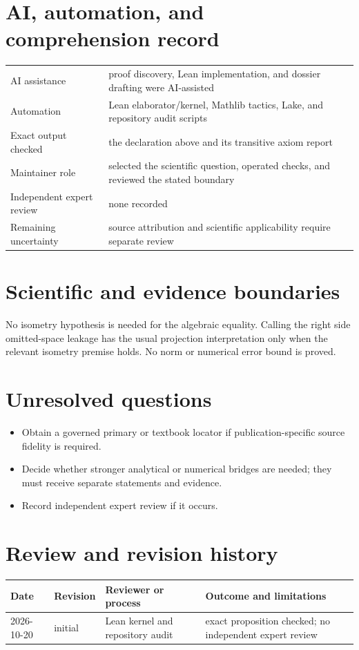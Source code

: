 \documentclass[11pt]{article}
\begin{document}
\section{AI, automation, and comprehension record}
\begin{tabularx}{\textwidth}{@{}lY@{}}\toprule
AI assistance & proof discovery, Lean implementation, and dossier drafting were AI-assisted \\
Automation & Lean elaborator/kernel, Mathlib tactics, Lake, and repository audit scripts \\
Exact output checked & the declaration above and its transitive axiom report \\
Maintainer role & selected the scientific question, operated checks, and reviewed the stated boundary \\
Independent expert review & none recorded \\
Remaining uncertainty & source attribution and scientific applicability require separate review \\
\bottomrule\end{tabularx}

\section{Scientific and evidence boundaries}
No isometry hypothesis is needed for the algebraic equality. Calling the right side omitted-space leakage has the usual projection interpretation only when the relevant isometry premise holds. No norm or numerical error bound is proved.

\section{Unresolved questions}
\begin{itemize}
\item Obtain a governed primary or textbook locator if publication-specific source fidelity is required.
\item Decide whether stronger analytical or numerical bridges are needed; they must receive separate statements and evidence.
\item Record independent expert review if it occurs.
\end{itemize}

\section{Review and revision history}
\begin{tabularx}{\textwidth}{@{}lllX@{}}\toprule
Date & Revision & Reviewer or process & Outcome and limitations \\
\midrule
2026-10-20 & initial & Lean kernel and repository audit & exact proposition checked; no independent expert review \\
\bottomrule\end{tabularx}
\end{document}
